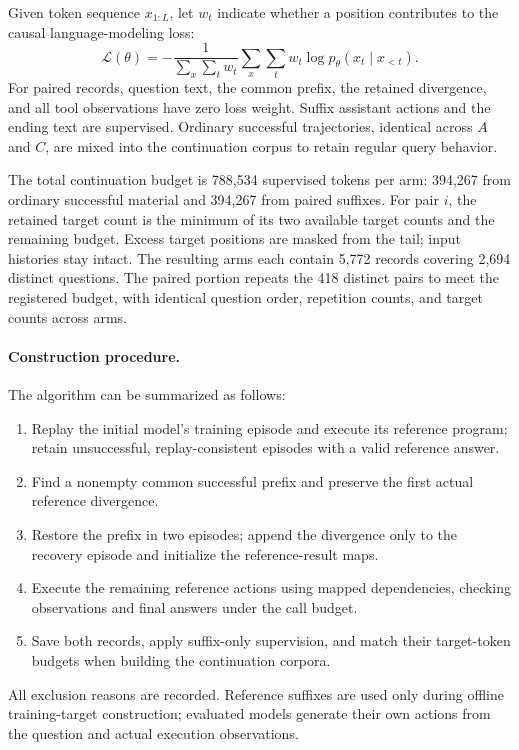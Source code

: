 Given token sequence $x_{1:L}$, let $w_t$ indicate whether a position contributes to the causal language-modeling loss:
\begin{equation}
 \mathcal{L}(\theta)=
 -\frac{1}{\sum_x\sum_t w_t}
 \sum_x\sum_t w_t\log p_\theta(x_t\mid x_{<t}).
\end{equation}
For paired records, question text, the common prefix, the retained divergence, and all tool observations have zero loss weight. Suffix assistant actions and the ending text are supervised. Ordinary successful trajectories, identical across $A$ and $C$, are mixed into the continuation corpus to retain regular query behavior.

The total continuation budget is 788,534 supervised tokens per arm: 394,267 from ordinary successful material and 394,267 from paired suffixes. For pair $i$, the retained target count is the minimum of its two available target counts and the remaining budget. Excess target positions are masked from the tail; input histories stay intact. The resulting arms each contain 5,772 records covering 2,694 distinct questions. The paired portion repeats the 418 distinct pairs to meet the registered budget, with identical question order, repetition counts, and target counts across arms.

\paragraph{Construction procedure.}
The algorithm can be summarized as follows:
\begin{enumerate}
 \item Replay the initial model's training episode and execute its reference program; retain unsuccessful, replay-consistent episodes with a valid reference answer.
 \item Find a nonempty common successful prefix and preserve the first actual reference divergence.
 \item Restore the prefix in two episodes; append the divergence only to the recovery episode and initialize the reference-result maps.
 \item Execute the remaining reference actions using mapped dependencies, checking observations and final answers under the call budget.
 \item Save both records, apply suffix-only supervision, and match their target-token budgets when building the continuation corpora.
\end{enumerate}
All exclusion reasons are recorded. Reference suffixes are used only during offline training-target construction; evaluated models generate their own actions from the question and actual execution observations.

